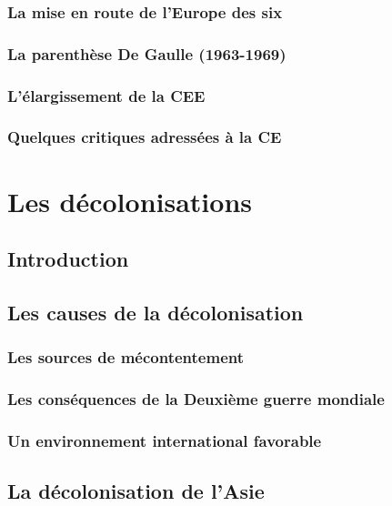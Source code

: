 \documentclass[12pt]{report}
\begin{document}
\subsection{La mise en route de l'Europe des six}

\subsection{La parenthèse De Gaulle (1963-1969)}

\subsection{L'élargissement de la CEE}

\subsection{Quelques critiques adressées à la CE}


\chapter{Les décolonisations}

\section*{Introduction}

\section{Les causes de la décolonisation}

\subsection{Les sources de mécontentement}

\subsection{Les conséquences de la Deuxième guerre mondiale}

\subsection{Un environnement international favorable}

\section{La décolonisation de l'Asie}
\end{document}
